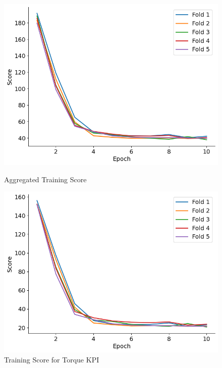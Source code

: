 \documentclass{report} %
\begin{document}
\begin{figure}[H]
    \centering
    \begin{minipage}[b]{0.325\textwidth}
        \includegraphics[width=\textwidth]{./ReportImages/train_score.png}
        \caption{\centering Aggregated Training Score}
        \label{fig:Aggregated Training Score}
    \end{minipage}
    \hfill
    \begin{minipage}[b]{0.325\textwidth}
        \includegraphics[width=\textwidth]{./ReportImages/train_score_y1.png}
        \caption{\centering Training Score for Torque \ac{KPI}}
        \label{fig:Training Score for Torque Curve}
    \end{minipage}

\end{figure}
\end{document}

